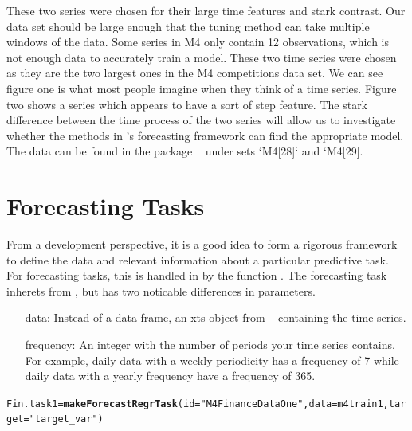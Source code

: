 \documentclass[article]{jss}\usepackage[]{graphicx}\usepackage[]{color}
\makeatletter
\newcommand{\hlstr}[1]{\textcolor[rgb]{0.192,0.494,0.8}{#1}}%
\newcommand{\hlstd}[1]{\textcolor[rgb]{0.345,0.345,0.345}{#1}}%
\newcommand{\hlkwb}[1]{\textcolor[rgb]{0.69,0.353,0.396}{#1}}%
\newcommand{\hlkwc}[1]{\textcolor[rgb]{0.333,0.667,0.333}{#1}}%
\newcommand{\hlkwd}[1]{\textcolor[rgb]{0.737,0.353,0.396}{\textbf{#1}}}%
\newenvironment{kframe}{%
 \def\at@end@of@kframe{}%
 \ifinner\ifhmode%
  \def\at@end@of@kframe{\end{minipage}}%
  \begin{minipage}{\columnwidth}%
 \fi\fi%
 \def\FrameCommand##1{\hskip\@totalleftmargin \hskip-\fboxsep
 \colorbox{shadecolor}{##1}\hskip-\fboxsep
     \hskip-\linewidth \hskip-\@totalleftmargin \hskip\columnwidth}%
 \MakeFramed {\advance\hsize-\width
   \@totalleftmargin\z@ \linewidth\hsize
   \@setminipage}}%
 {\par\unskip\endMakeFramed%
 \at@end@of@kframe}
\newenvironment{knitrout}{}{} %
\makeatother
\begin{document}
These two series were chosen for their large time features and stark contrast. Our data set should be large enough that the tuning method can take multiple windows of the data. Some series in M4 only contain 12 observations, which is not enough data to accurately train a model. These two time series were chosen as they are the two largest ones in the M4 competitions data set. We can see figure one is what most people imagine when they think of a time series. Figure two shows a series which appears to have a sort of step feature. The stark difference between the time process of the two series will allow us to investigate whether the methods in 's forecasting framework can find the appropriate model. The data can be found in the package  ~\cite{m4comp} under sets `M4[28]` and `M4[29]. 

\section{Forecasting Tasks}

From a development perspective, it is a good idea to form a rigorous framework to define the data and relevant information about a particular predictive task. For forecasting tasks, this is handled in  by the function . The forecasting task inherets from , but has two noticable differences in parameters.

\begin{itemize}
\item[data:] Instead of a data frame, an xts object from  ~\cite{xts} containing the time series.
\item[frequency:] An integer with the number of periods your time series contains. For example, daily data with a weekly periodicity has a frequency of 7 while daily data with a yearly frequency have a frequency of 365.
\end{itemize}

\begin{knitrout}
\color{fgcolor}\begin{kframe}
\begin{alltt}
\hlstd{Fin.task1} \hlkwb{=} \hlkwd{makeForecastRegrTask}\hlstd{(}\hlkwc{id} \hlstd{=} \hlstr{"M4 Finance Data One"}\hlstd{,} \hlkwc{data} \hlstd{= m4train1,} \hlkwc{target} \hlstd{=} \hlstr{"target_var"}\hlstd{)}
\end{alltt}
\end{kframe}
\end{knitrout}
\end{document}

